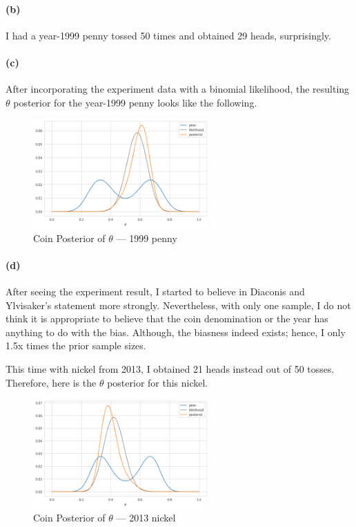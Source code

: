 \documentclass[11pt, letterpaper]{article}
\begin{document}
\paragraph{(b)}
I had a year-1999 penny tossed 50 times and obtained 29 heads, surprisingly.

\paragraph{(c)}
After incorporating the experiment data with a binomial likelihood, the resulting $\theta$ posterior for the year-1999
penny looks like the following.

\begin{figure}[!h]
  \centering
  \includegraphics[width=0.6\textwidth]{3.8.c.png}
  \captionsetup{justification=centering}
  \caption{Coin Posterior of $\theta$ --- 1999 penny}
\end{figure}

\paragraph{(d)}
After seeing the experiment result, I started to believe in Diaconis and Ylvisaker's statement more strongly.
Nevertheless, with only one sample, I do not think it is appropriate to believe that the coin denomination or the
year has anything to do with the bias. Although, the biasness indeed exists; hence, I only 1.5x times
the prior sample sizes.

\vspace{0.15in}

This time with nickel from 2013, I obtained 21 heads instead out of 50 tosses. Therefore, here is the
$\theta$ posterior for this nickel.

\begin{figure}[!h]
  \centering
  \includegraphics[width=0.6\textwidth]{3.8.d.png}
  \captionsetup{justification=centering}
  \caption{Coin Posterior of $\theta$ --- 2013 nickel}
\end{figure}
\end{document}
